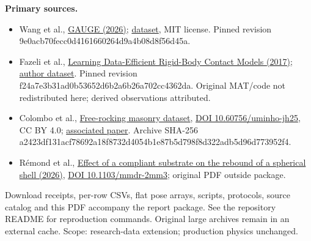 \documentclass[10pt,a4paper]{article}
\begin{document}
\textbf{Primary sources.}\small
\begin{itemize}
\item Wang et al., \href{https://arxiv.org/html/2608.05948v1}{GAUGE (2026)};
\href{https://huggingface.co/datasets/InternRobotics/GAUGE-Dataset}{dataset}, MIT license.
\newline Pinned revision 9e0acb70fecc0d4161660264d9a4b08d8f56d45a.
\item Fazeli et al., \href{https://proceedings.mlr.press/v78/fazeli17a.html}{Learning Data-Efficient Rigid-Body Contact Models (2017)};
\href{https://github.com/mcubelab/planar-impact-dataset}{author dataset}.
\newline Pinned revision f24a7e3b31ad0b53652d6b2a6b26a702cc4362da.
Original MAT/code not redistributed here; derived observations attributed.
\item Colombo et al., \href{https://experiments.builtenvdata.eu/datasets/92/}{Free-rocking masonry dataset},
\href{https://doi.org/10.60756/uminho-jh25}{DOI 10.60756/uminho-jh25}, CC BY 4.0;
\href{https://link.springer.com/article/10.1007/s10518-025-02224-8}{associated paper}.
Archive SHA-256 a2423df131acf78692a18f8732d4054b1e87b5d798f8d322adb5d96d773952f4.
\item R\'emond et al., \href{https://data.hal.science/document/hal-05532284v1}{Effect of a compliant substrate on the rebound of a spherical shell (2026)},
\href{https://doi.org/10.1103/mmdr-2mm3}{DOI 10.1103/mmdr-2mm3}; original PDF outside package.
\end{itemize}
\normalsize Download receipts, per-row CSVs, flat pose arrays, scripts, protocols,
source catalog and this PDF accompany the report package. See the repository
README for reproduction commands. Original large archives remain in an external
cache. Scope: research-data extension; production physics unchanged.
\end{document}
